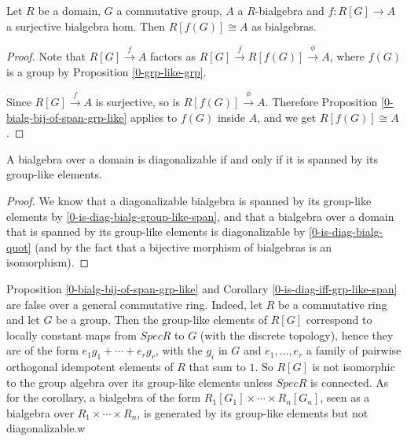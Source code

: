 \begin{proposition}
  \label{0-is-diag-bialg-quot}

  Let $R$ be a domain, $G$ a commutative group,
  $A$ a $R$-bialgebra and $f : R[G] \to A$ a surjective bialgebra hom.
  Then $R[f(G)] \cong A$ as bialgebras.
\end{proposition}
\begin{proof}

  Note that $R[G] \xrightarrow f A$ factors as $R[G] \xrightarrow f R[f(G)] \xrightarrow\phi A$,
  where $f(G)$ is a group by Proposition \ref{0-grp-like-grp}.

  Since $R[G] \xrightarrow f A$ is surjective, so is $R[f(G)] \xrightarrow\phi A$.
  Therefore Proposition \ref{0-bialg-bij-of-span-grp-like} applies to $f(G)$ inside $A$,
  and we get $R[f(G)] \cong A$.
\end{proof}


\begin{corollary}
  \label{0-is-diag-bialg-iff-span-group-like}
  \leanok

  A bialgebra over a domain is diagonalizable if and only if it is spanned by its
  group-like elements.
\end{corollary}
\begin{proof}
  \leanok

  We know that a diagonalizable bialgebra is spanned by its group-like elements
  by \ref{0-is-diag-bialg-group-like-span}, and that a bialgebra over a domain
  that is spanned by its group-like elements is diagonalizable by
  \ref{0-is-diag-bialg-quot} (and by the fact that a bijective morphism
  of bialgebras is an isomorphism).
\end{proof}

Proposition \ref{0-bialg-bij-of-span-grp-like} and Corollary \ref{0-is-diag-iff-grp-like-span} are false over a general commutative ring.
Indeed, let $R$ be a commutative ring and let $G$ be a group.
Then the group-like elements of $R[G]$ correspond to locally constant maps from $Spec R$ to $G$ (with the discrete topology),
hence they are of the form $e_1 g_1+\cdots+e_r g_r$, with the $g_i$ in $G$ and $e_1,\ldots,e_r$ a family of pairwise orthogonal idempotent elements of $R$ that sum to $1$.
So $R[G]$ is not isomorphic to the group algebra over its group-like elements unless $Spec R$ is connected.
As for the corollary, a bialgebra of the form $R_1[G_1]\times\cdots\times R_n[G_n]$,
seen as a bialgebra over $R_1\times\cdots\times R_n$,
is generated by its group-like elements but not diagonalizable.w


